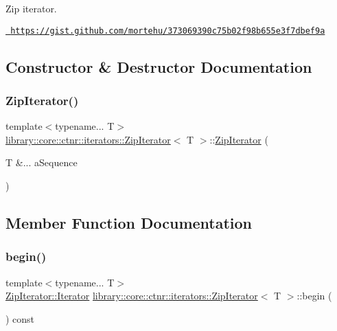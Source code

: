 Zip iterator. 

\href{https://gist.github.com/mortehu/373069390c75b02f98b655e3f7dbef9a}{\texttt{ https\+://gist.\+github.\+com/mortehu/373069390c75b02f98b655e3f7dbef9a}} 

\subsection{Constructor \& Destructor Documentation}
\mbox{\label{classlibrary_1_1core_1_1ctnr_1_1iterators_1_1_zip_iterator_a3d8960d14f07cf22a2de2994eabe46aa}} 
\subsubsection{\texorpdfstring{ZipIterator()}{ZipIterator()}}
{\footnotesize\ttfamily template$<$typename... T$>$ \\
\mbox{\hyperlink{classlibrary_1_1core_1_1ctnr_1_1iterators_1_1_zip_iterator}{library\+::core\+::ctnr\+::iterators\+::\+Zip\+Iterator}}$<$ T $>$\+::\mbox{\hyperlink{classlibrary_1_1core_1_1ctnr_1_1iterators_1_1_zip_iterator}{Zip\+Iterator}} (\begin{DoxyParamCaption}\item[{T \&...}]{a\+Sequence }\end{DoxyParamCaption})\hspace{0.3cm}{\ttfamily [inline]}}



\subsection{Member Function Documentation}
\mbox{\label{classlibrary_1_1core_1_1ctnr_1_1iterators_1_1_zip_iterator_a0467e25b565ac7b73b22a7002b87d189}} 
\subsubsection{\texorpdfstring{begin()}{begin()}}
{\footnotesize\ttfamily template$<$typename... T$>$ \\
\mbox{\hyperlink{classlibrary_1_1core_1_1ctnr_1_1iterators_1_1_zip_iterator_1_1_iterator}{Zip\+Iterator\+::\+Iterator}} \mbox{\hyperlink{classlibrary_1_1core_1_1ctnr_1_1iterators_1_1_zip_iterator}{library\+::core\+::ctnr\+::iterators\+::\+Zip\+Iterator}}$<$ T $>$\+::begin (\begin{DoxyParamCaption}{ }\end{DoxyParamCaption}) const\hspace{0.3cm}{\ttfamily [inline]}}


